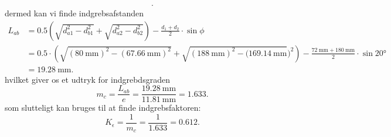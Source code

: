 \begin{derivation}
\begin{align*}
      .\end{align*}
      dermed kan vi finde indgrebsafstanden
      \begin{align*}
        L_{ab} &= \num{0,5} \left( \sqrt{d_{a1}^2 - d_{b1}^2} + \sqrt{d_{a2}^2 - d_{b2}^2} \right) - \frac{d_1 + d_2}{2} \cdot \sin \phi \\
               &= \num{0,5} \cdot \left( \sqrt{\left( \qty{80}{\mm}  \right)^2 - \left( \qty{67,66}{\mm}  \right)^2} + \sqrt{\left( \qty{188}{\mm}  \right)^2 - (\qty{169,14}{\mm} })^2 \right) - \frac{\qty{72}{\mm} + \qty{180}{\mm} }{2} \cdot \sin \ang{20} \\
               &= \qty{19,28}{\mm} 
      .\end{align*}
      hvilket giver os et udtryk for indgrebdsgraden
      \begin{equation*}
        m_c = \frac{L_{ab}}{e} = \frac{\qty{19,28}{\mm} }{\qty{11,81}{\mm}} = \num{1,633} 
      .\end{equation*}
      som slutteligt kan bruges til at finde indgrebsfaktoren:
      \begin{equation*}
        K_{\epsilon} = \frac{1}{m_c} = \frac{1}{\num{1,633}} = \num{0,612} 
      .\end{equation*}
      

\end{derivation}
